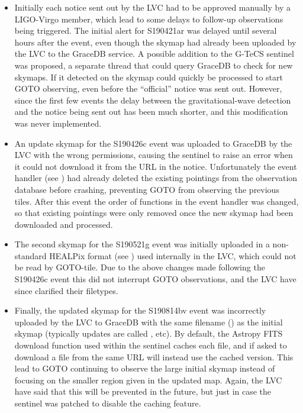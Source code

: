 \begin{colsection}
\begin{itemize}
    \item Initially each notice sent out by the LVC had to be approved manually by a LIGO-Virgo member, which lead to some delays to follow-up observations being triggered. The initial alert for S190421ar was delayed until several hours after the event, even though the skymap had already been uploaded by the LVC to the GraceDB service. A possible addition to the G-TeCS sentinel was proposed, a separate thread that could query GraceDB to check for new skymaps. If it detected on the skymap could quickly be processed to start GOTO observing, even before the ``official'' notice was sent out. However, since the first few events the delay between the gravitational-wave detection and the notice being sent out has been much shorter, and this modification was never implemented.
    \item An update skymap for the S190426c event was uploaded to GraceDB by the LVC with the wrong permissions, causing the sentinel to raise an error when it could not download it from the URL in the notice. Unfortunately the event handler (see ) had already deleted the existing pointings from the observation database before crashing, preventing GOTO from observing the previous tiles. After this event the order of functions in the event handler was changed, so that existing pointings were only removed once the new skymap had been downloaded and processed.
    \item The second skymap for the S190521g event was initially uploaded in a non-standard HEALPix format (see ) used internally in the LVC, which could not be read by GOTO-tile. Due to the above changes made following the S190426c event this did not interrupt GOTO observations, and the LVC have since clarified their filetypes.
    \item Finally, the updated skymap for the S190814bv event was incorrectly uploaded by the LVC to GraceDB with the same filename () as the initial skymap (typically updates are called , etc). By default, the Astropy FITS download function used within the sentinel caches each file, and if asked to download a file from the same URL will instead use the cached version. This lead to GOTO continuing to observe the large initial skymap instead of focusing on the smaller region given in the updated map. Again, the LVC have said that this will be prevented in the future, but just in case the sentinel was patched to disable the caching feature.
\end{itemize}

\end{colsection}

